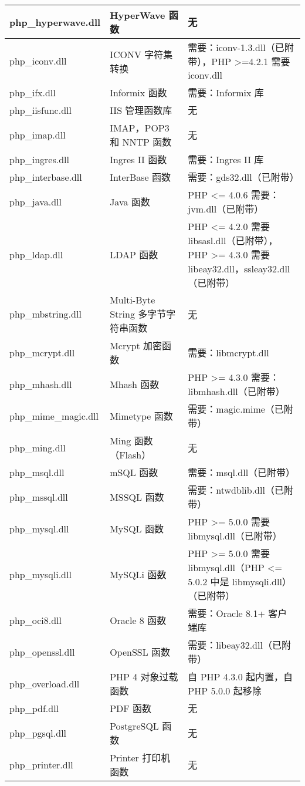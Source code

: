 \begin{longtable}{|m{60pt}|m{130pt}|m{200pt}|}
\hline
php\_hyperwave.dll		&HyperWave 函数	&无\\
\hline
php\_iconv.dll			&ICONV 字符集转换	&需要：iconv-1.3.dll（已附带），PHP >=4.2.1 需要 iconv.dll\\
\hline
php\_ifx.dll				&Informix 函数	&需要：Informix 库\\
\hline
php\_iisfunc.dll			&IIS 管理函数库	&无\\
\hline
php\_imap.dll			&IMAP，POP3 和 NNTP 函数	&无\\
\hline
php\_ingres.dll			&Ingres II 函数	&需要：Ingres II 库\\
\hline
php\_interbase.dll		&InterBase 函数	&需要：gds32.dll（已附带）\\
\hline
php\_java.dll				&Java 函数	&PHP <= 4.0.6 需要：jvm.dll（已附带）\\
\hline
php\_ldap.dll			&LDAP 函数	&PHP <= 4.2.0 需要 libsasl.dll（已附带），PHP >= 4.3.0 需要 libeay32.dll，ssleay32.dll（已附带）\\
\hline
php\_mbstring.dll		& Multi-Byte String 多字节字符串函数	&无\\
\hline
php\_mcrypt.dll			& Mcrypt 加密函数	&需要：libmcrypt.dll\\
\hline
php\_mhash.dll			& Mhash 函数	&PHP >= 4.3.0 需要：libmhash.dll（已附带）\\
\hline
php\_mime\_magic.dll		& Mimetype 函数	&需要：magic.mime（已附带）\\
\hline
php\_ming.dll			& Ming 函数（Flash）	&无\\
\hline
php\_msql.dll			&mSQL 函数	&需要：msql.dll（已附带）\\
\hline
php\_mssql.dll			& MSSQL 函数	&需要：ntwdblib.dll（已附带）\\
\hline
php\_mysql.dll			& MySQL 函数	&PHP >= 5.0.0 需要 libmysql.dll（已附带）\\
\hline
php\_mysqli.dll			& MySQLi 函数	&PHP >= 5.0.0 需要 libmysql.dll（PHP <= 5.0.2 中是 libmysqli.dll）（已附带）\\
\hline
php\_oci8.dll			&Oracle 8 函数	&需要：Oracle 8.1+ 客户端库\\
\hline
php\_openssl.dll			&OpenSSL 函数	&需要：libeay32.dll（已附带）\\
\hline
php\_overload.dll		&PHP 4 对象过载函数	&自 PHP 4.3.0 起内置，自 PHP 5.0.0 起移除\\
\hline
php\_pdf.dll				&PDF 函数	&无\\
\hline
php\_pgsql.dll			&PostgreSQL 函数	&无\\
\hline
php\_printer.dll			&Printer 打印机函数	&无\\

\end{longtable}
